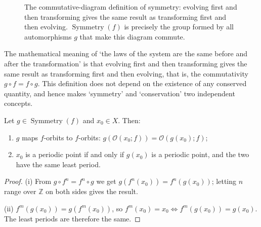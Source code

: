 \begin{figure}[htbp]
\centering
{}
\caption{The commutative-diagram definition of symmetry: evolving first and then transforming gives the same result as transforming first and then evolving. $\operatorname{Symmetry}(f)$ is precisely the group formed by all automorphisms $g$ that make this diagram commute.}
\label{fig:symmetry_commute}
\end{figure}

\begin{remark}\label{rem:why_centraliser}
The mathematical meaning of `the laws of the system are the same before and after the transformation' is that evolving first and then transforming gives the same result as transforming first and then evolving, that is, the commutativity $g\circ f=f\circ g$. This definition does not depend on the existence of any conserved quantity, and hence makes `symmetry' and `conservation' two independent concepts.
\end{remark}

\begin{proposition}\label{prop:symmetry_preserves_orbits}
Let $g\in\operatorname{Symmetry}(f)$ and $x_0\in X$. Then:
\begin{enumerate}[label=(\roman*)]
    \item $g$ maps $f$-orbits to $f$-orbits: $g(\mathcal{O}(x_0;f))=\mathcal{O}(g(x_0);f)$;
    \item $x_0$ is a periodic point if and only if $g(x_0)$ is a periodic point, and the two have the same least period.
\end{enumerate}
\end{proposition}

\begin{proof}
(i) From $g\circ f^n=f^n\circ g$ we get $g(f^n(x_0))=f^n(g(x_0))$; letting $n$ range over $\mathbb{Z}$ on both sides gives the result.

(ii) $f^m(g(x_0))=g(f^m(x_0))$, so $f^m(x_0)=x_0\iff f^m(g(x_0))=g(x_0)$. The least periods are therefore the same.
\end{proof}

